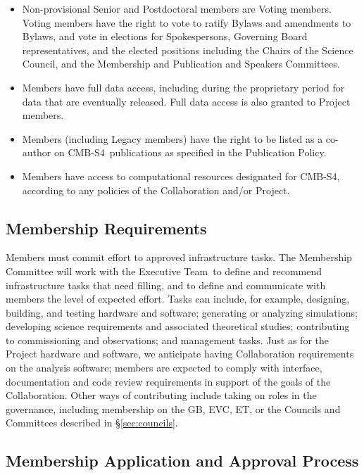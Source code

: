 \documentclass[12pt]{article}
\newcommand{\exec}{{Executive Team}}
\newcommand\collabname{CMB-S4}
\begin{document}
\begin{itemize}

\item Non-provisional Senior and Postdoctoral members are Voting members.  Voting members have the right to vote to ratify Bylaws and amendments to Bylaws, and vote in elections for Spokespersons, Governing Board representatives, and the elected positions including the Chairs of the Science Council, and the Membership and Publication and Speakers Committees. 

\item Members have full data access, including during the proprietary period for data that are eventually released. Full data access is also granted to Project members.

\item Members (including Legacy members) have the right to be listed as a co-author on \collabname\ publications as specified in the Publication Policy.

\item Members have access to computational resources designated for \collabname, according to any policies of the Collaboration and/or Project.

\end{itemize}

\subsection{Membership Requirements}

Members must commit effort to approved infrastructure tasks. The Membership Committee will work with the \exec\ to define and recommend infrastructure tasks that need filling, and to define and communicate with members the level of expected effort. Tasks can include, for example, designing, building, and testing hardware and software; generating or analyzing simulations; developing science requirements and associated theoretical studies; contributing to commissioning and observations; and management tasks. Just as for the Project hardware and software, we anticipate having Collaboration requirements on the analysis software; members are expected to comply with interface, documentation and code review requirements in support of the goals of the Collaboration. Other ways of contributing include taking on roles in the governance, including membership on the GB, EVC, ET, or the Councils and Committees described in \S\ref{sec:councils}.

\subsection{Membership Application and Approval Process}
\end{document}
